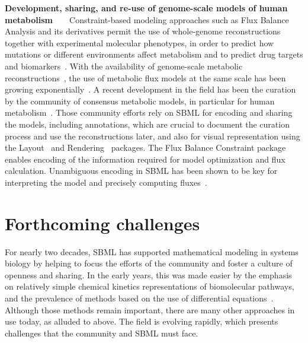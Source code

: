 \documentclass[]{draft-sbml-paper}
\begin{document}
\textbf{Development, sharing, and re-use of genome-scale models of human metabolism}~~~~Constraint-based modeling approaches such as Flux Balance Analysis and its derivatives permit the use of whole-genome reconstructions together with experimental molecular phenotypes, in order to predict how mutations or different environments affect metabolism and to predict drug targets and biomarkers~\citep{savinell1992network, obrien2015}.  With the availability of genome-scale metabolic reconstructions~\citep{edwards1999systems}, the use of metabolic flux models at the same scale has been growing exponentially~\citep{Bordbar2014a}. A recent development in the field has been the curation by the community of consensus metabolic models, in particular for human metabolism~\citep{brunk2018}. Those community efforts rely on SBML for encoding and sharing the models, including annotations, which are crucial to document the curation process and use the reconstructions later, and also for visual representation using the Layout~\citep{Gauges2015} and Rendering~\citep{Bergmann2018sbml} packages. The Flux Balance Constraint package~\citep{Olivier2018a} enables encoding of the information required for model optimization and flux calculation. Unambiguous encoding in SBML has been shown to be key for interpreting the model and precisely computing fluxes~\citep{Ebrahim2015}.

\hrulefill
\newpage

\section*{Forthcoming challenges}

For nearly two decades, SBML has supported mathematical modeling in systems biology by helping to focus the efforts of the community and foster a culture of openness and sharing. In the early years, this was made easier by the emphasis on relatively simple chemical kinetics representations of biomolecular pathways, and the prevalence of methods based on the use of differential equations~\citep{hubner2011applications}.  Although those methods remain important, there are many other approaches in use today, as alluded to above.  The field is evolving rapidly, which presents challenges that the community and SBML must face.
\end{document}

